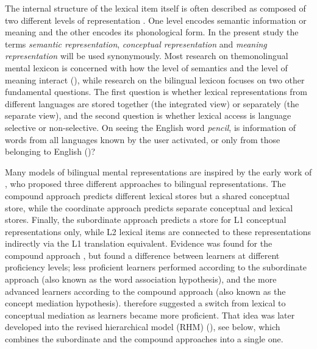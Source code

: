 \documentclass[output=paper,colorlinks,citecolor=brown,nonflat]{langsci/langscibook}
\begin{document}
{\sloppy The internal structure of the lexical item itself is often described as composed of two different levels of representation \citep{Levelt1989}. One level encodes semantic information or meaning and the other encodes its phonological form. In the present study the terms \textit{semantic representation}, \textit{conceptual representation} and \textit{meaning representation} will be used synonymously. Most research on the\linebreak monolingual mental lexicon is concerned with how the level of semantics and the level of meaning interact (\citealt{DellOSeaghdha1991, DellOSeaghdha1992, LeveltEtAl1991Picture, LeveltEtAl1991Reply, Levelt1992}), while research on the bilingual lexicon focuses on two other fundamental questions. The first question is whether lexical representations from different languages are stored together (the integrated view) or separately (the separate view), and the second question is whether lexical access is language selective or non-selective. On seeing the English word \textit{pencil}, is information of words from all languages known by the user activated, or only from those belonging to English (\citealt{Weinreich1953, SánchezCasasEtAl1992, Poulisse1997, DijkstraVanHeuven1998, DijkstraVanHeuven2002, VanHeuvenEtAl1998, VanHeuvenEtAl2011, Dijkstra2003, Dijkstra2005, LemhöferDijkstra2004, LemhöferEtAl2004, Costa2005,  KrollDeGroot2005, LaHeij2005, DijkstraEtAl2010, KrollEtAl2010, DeAngelisEtAl2015})?}

Many models of bilingual mental representations are inspired by the early work of \citet{Weinreich1953}, who proposed three different approaches to bilingual representations. The compound approach predicts different lexical stores but a shared conceptual store, while the coordinate approach predicts separate conceptual and lexical stores. Finally, the subordinate approach predicts a store for L1 conceptual representations only, while L2 lexical items are connected to these representations indirectly via the L1 translation equivalent. Evidence was found for the compound approach \citep{PotterEtAl1984}, but \citet{KrollCurley1988} found a difference between learners at different proficiency levels; less proficient learners performed according to the subordinate approach (also known as the word association hypothesis), and the more advanced learners according to the compound approach (also known as the concept mediation hypothesis). \citeauthor{KrollCurley1988} therefore suggested a switch from lexical to conceptual mediation as learners became more proficient. That idea was later developed into the revised hierarchical model (RHM) (\citealt{KrollStewart1994, KrollEtAl2010}), see  below, which combines the subordinate and the compound approaches into a single one.
\end{document}
